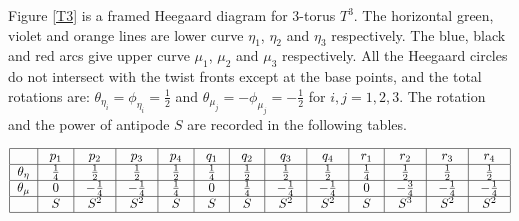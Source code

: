 \documentclass[12pt]{amsart}
\begin{document}
Figure \ref{T3} is a framed Heegaard diagram for 3-torus $T^3$. The horizontal green, violet and orange lines are lower curve $\eta_1$, $\eta_2$ and $\eta_3$ respectively. The blue, black and red arcs give upper curve $\mu_1$, $\mu_2$ and $\mu_3$ respectively. All the Heegaard circles do not intersect with the twist fronts except at the base points, and the total rotations are: $\theta_{\eta_i}=\phi_{\eta_i}=\frac{1}{2}$ and $\theta_{\mu_j}=-\phi_{\mu_j}=-\frac{1}{2}$ for $i, j=1, 2, 3$. The rotation and the power of antipode $S$ are recorded in the following tables. 






\[
\begin{tabular}{|c|c|c|c|c|c|c|c|c|c|c|c|c|} 
\hline 
& ~$p_1$~  & ~$p_2$~ & ~$p_3$~ & ~$p_4$~ & ~$q_1$~  & ~$q_2$~ & ~$q_3$~ & ~$q_4$~ & ~$r_1$~  & ~$r_2$~ & ~$r_3$~ & ~$r_4$~ \tabularnewline
\hline 
$\theta_\eta$ & ~$\frac{1}{4}$~  & ~$\frac{1}{2}$~ & ~$\frac{1}{2}$~ & ~$\frac{1}{2}$~  & ~$\frac{1}{4}$~ & ~$\frac{1}{2}$~ & ~$\frac{1}{2}$~ & ~$\frac{1}{2}$~ & ~$\frac{1}{4}$~  & ~$\frac{1}{2}$~ & ~$\frac{1}{2}$~ & ~$\frac{1}{2}$~  \tabularnewline
\hline 
$\theta_\mu$ & ~$0$~ & ~$-\tfrac{1}{4}$~ & ~$-\tfrac{1}{4}$~ & ~$\tfrac{1}{4}$~ & ~$0$~ & ~$\tfrac{1}{4}$~ & ~$-\tfrac{1}{4}$~ & ~$-\tfrac{1}{4}$~ & ~$0$~  & ~$-\tfrac{3}{4}$~ & ~$-\tfrac{1}{4}$~ & ~$-\tfrac{1}{4}$~ \tabularnewline
\hline
& ~$S$~ & ~$S^2$~ & ~$S^2$~ & ~$S$~ & ~$S$~ & ~$S$~ & ~$S^2$~ & ~$S^2$~ & ~$S$~  & ~$S^3$~ & ~$S^2$~ & ~$S^2$~ \tabularnewline
\hline
\end{tabular}
\]
\end{document}
